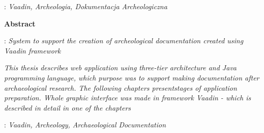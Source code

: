 \begin{titlepage}
    : {\itshape Vaadin, Archeologia, Dokumentacja Archeologiczna}
    \par
    \vspace{4\baselineskip}
    \begin{center}
	{\large\bfseries Abstract}\par\bigskip
    \end{center}
    : {\itshape 
	System to support the creation of archeological documentation created using Vaadin framework}\par
    \vspace*{1\baselineskip}
    {\itshape
    This thesis describes web application using three-tier architecture and Java programming language, which purpose was to support making documentation after archaeological research. The following chapters presentstages of application preparation. Whole graphic interface was made in framework Vaadin - which is described in detail in one of the chapters}
    \vspace*{1\baselineskip}

    : {\itshape Vaadin, Archeology, Archaeological Documentation}

\end{titlepage}

